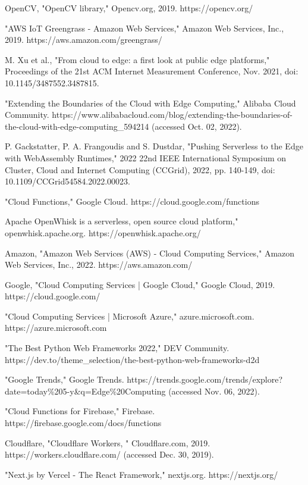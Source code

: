 \begin{thebibliography}{9}
OpenCV, "OpenCV library," Opencv.org, 2019. https://opencv.org/

"AWS IoT Greengrass - Amazon Web Services," Amazon Web Services, Inc., 2019. https://aws.amazon.com/greengrass/

M. Xu et al., "From cloud to edge: a first look at public edge platforms," Proceedings of the 21st ACM Internet Measurement Conference, Nov. 2021, doi: 10.1145/3487552.3487815.

"Extending the Boundaries of the Cloud with Edge Computing," Alibaba Cloud Community. https://www.alibabacloud.com/blog/extending-the-boundaries-of-the-cloud-with-edge-computing\_594214 (accessed Oct. 02, 2022).

P. Gackstatter, P. A. Frangoudis and S. Dustdar, "Pushing Serverless to the Edge with WebAssembly Runtimes," 2022 22nd IEEE International Symposium on Cluster, Cloud and Internet Computing (CCGrid), 2022, pp. 140-149, doi: 10.1109/CCGrid54584.2022.00023.

"Cloud Functions," Google Cloud. https://cloud.google.com/functions

Apache OpenWhisk is a serverless, open source cloud platform," openwhisk.apache.org. https://openwhisk.apache.org/

Amazon, "Amazon Web Services (AWS) - Cloud Computing Services," Amazon Web Services, Inc., 2022. https://aws.amazon.com/

Google, "Cloud Computing Services  |  Google Cloud," Google Cloud, 2019. https://cloud.google.com/

"Cloud Computing Services | Microsoft Azure," azure.microsoft.com. https://azure.microsoft.com

"The Best Python Web Frameworks 2022," DEV Community. https://dev.to/theme\_selection/the-best-python-web-frameworks-d2d

"Google Trends," Google Trends. https://trends.google.com/trends/explore?date=today\%205-y\&q=Edge\%20Computing (accessed Nov. 06, 2022).

"Cloud Functions for Firebase," Firebase. https://firebase.google.com/docs/functions

Cloudflare, "Cloudflare Workers, " Cloudflare.com, 2019. https://workers.cloudflare.com/ (accessed Dec. 30, 2019).

"Next.js by Vercel - The React Framework," nextjs.org. https://nextjs.org/


\end{thebibliography}
